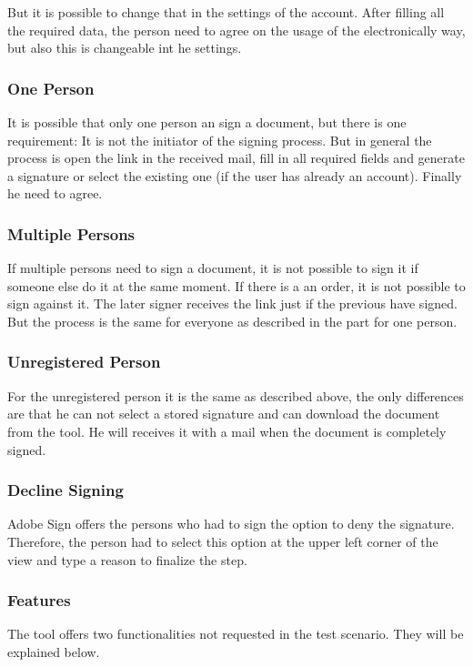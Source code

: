 But it is possible to change that in the settings of the account. After filling all the required data, the person need to agree on the usage of the electronically way, but also this is changeable int he settings. 

\subsubsection{One Person}
It is possible that only one person an sign a document, but there is one requirement: It is not the initiator of the signing process. But in general the process is open the link in the received mail, fill in all required fields and generate a signature or select the existing one (if the user has already an account). Finally he need to agree.

\subsubsection{Multiple Persons}
If multiple persons need to sign a document, it is not possible to sign it if someone else do it at the same moment. If there is a an order, it is not possible to sign against it. The later signer receives the link just if the previous have signed. But the process is the same for everyone as described in the part for one person.

\subsubsection{Unregistered Person}
For the unregistered person it is the same as described above, the only differences are that he can not select a stored signature and can download the document from the tool. He will receives it with a mail when the document is completely signed.

\subsubsection{Decline Signing}
Adobe Sign offers the persons who had to sign the option to deny the signature. Therefore, the person had to select this option at the upper left corner of the view and type a reason to finalize the step. 

\subsubsection{Features}
The tool offers two functionalities not requested in the test scenario. They will be explained below.

